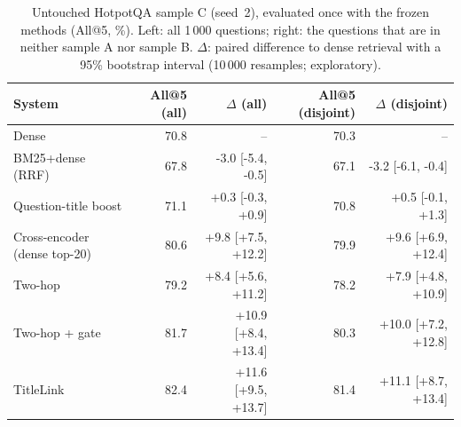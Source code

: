 \begin{table}[t]
\centering
\small
\caption{Untouched HotpotQA sample C (seed~2), evaluated once with the frozen methods (All@5, \%). Left: all 1\,000 questions; right: the \RcDisj{} questions that are in neither sample A nor sample B. $\Delta$: paired difference to dense retrieval with a 95\% bootstrap interval (10\,000 resamples; exploratory).}
\label{tab:r6c}
\begin{tabular}{lrrrr}
\toprule
System & All@5 (all) & $\Delta$ (all) & All@5 (disjoint) & $\Delta$ (disjoint) \\
\midrule
Dense & 70.8 & -- & 70.3 & -- \\
BM25+dense (RRF) & 67.8 & -3.0 [-5.4, -0.5] & 67.1 & -3.2 [-6.1, -0.4] \\
Question-title boost & 71.1 & +0.3 [-0.3, +0.9] & 70.8 & +0.5 [-0.1, +1.3] \\
Cross-encoder (dense top-20) & 80.6 & +9.8 [+7.5, +12.2] & 79.9 & +9.6 [+6.9, +12.4] \\
Two-hop & 79.2 & +8.4 [+5.6, +11.2] & 78.2 & +7.9 [+4.8, +10.9] \\
Two-hop + gate & 81.7 & +10.9 [+8.4, +13.4] & 80.3 & +10.0 [+7.2, +12.8] \\
TitleLink & 82.4 & +11.6 [+9.5, +13.7] & 81.4 & +11.1 [+8.7, +13.4] \\
\bottomrule
\end{tabular}
\end{table}
